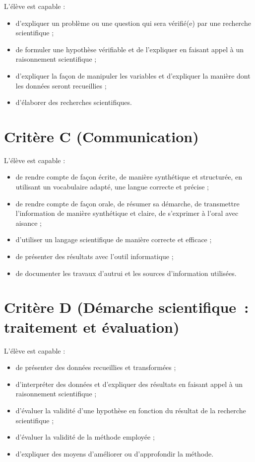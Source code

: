 L'élève est capable :
\begin{itemize}
\item d’expliquer un problème ou une question qui sera vérifié(e) par une recherche scientifique ;
\item de formuler une hypothèse vérifiable et de l’expliquer en faisant appel à un raisonnement scientifique ;
\item d’expliquer la façon de manipuler les variables et d’expliquer la manière dont les données seront recueillies ;
\item d’élaborer des recherches scientifiques.
\end{itemize}



\section{Critère C (Communication)}

L'élève est capable :
\begin{itemize}
\item de rendre compte de façon écrite, de manière synthétique et structurée, en utilisant un vocabulaire adapté, une langue correcte et précise ;
\item de rendre compte de façon orale, de résumer sa démarche, de transmettre l’information de manière synthétique et claire, de s’exprimer à l’oral avec aisance ;
\item d'utiliser un langage scientifique de manière correcte et efficace ;
\item de présenter des résultats avec l'outil informatique ;
\item de documenter les travaux d’autrui et les sources d’information utilisées.
\end{itemize}


\section{Critère D (Démarche scientifique : traitement et évaluation)}

L'élève est capable :
\begin{itemize}
    \item de présenter des données recueillies et transformées ;
    \item d’interpréter des données et d’expliquer des résultats en faisant appel à un raisonnement scientifique ;
    \item d’évaluer la validité d’une hypothèse en fonction du résultat de la recherche scientifique ;
    \item d’évaluer la validité de la méthode employée ;
    \item d’expliquer des moyens d’améliorer ou d’approfondir la méthode.
\end{itemize}






